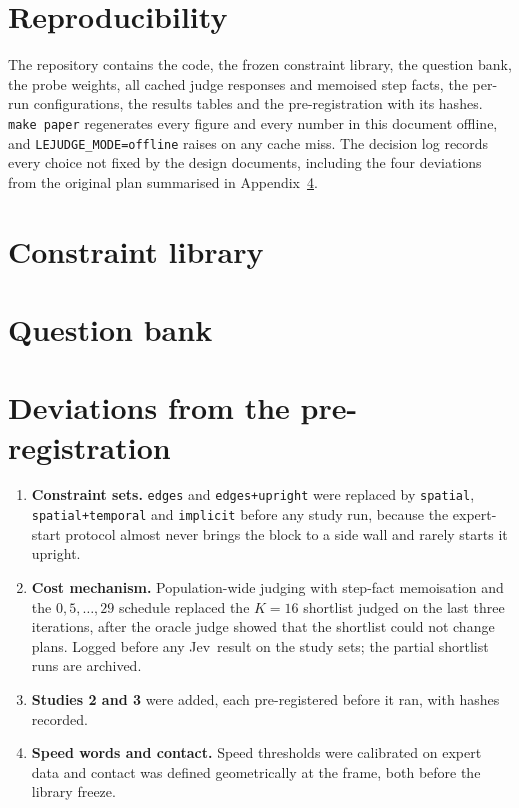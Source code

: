 \documentclass[11pt]{article}
\newcommand{\jev}{Jev}
\begin{document}
\section{Reproducibility}\label{sec:repro}
The repository contains the code, the frozen constraint library, the question bank, the probe weights, all  cached judge responses and  memoised step facts, the per-run configurations, the results tables and the pre-registration with its hashes. \texttt{make paper} regenerates every figure and every number in this document offline, and \texttt{LEJUDGE\_MODE=offline} raises on any cache miss. The decision log records every choice not fixed by the design documents, including the four deviations from the original plan summarised in Appendix~\ref{app:deviations}.




\appendix
\section{Constraint library}\label{app:library}
\footnotesize
\normalsize

\section{Question bank}\label{app:bank}

\normalsize

\section{Deviations from the pre-registration}\label{app:deviations}
\begin{enumerate}\setlength\itemsep{2pt}
\item \textbf{Constraint sets.} \texttt{edges} and \texttt{edges+upright} were replaced by \texttt{spatial}, \texttt{spatial+temporal} and \texttt{implicit} before any study run, because the expert-start protocol almost never brings the block to a side wall and rarely starts it upright.
\item \textbf{Cost mechanism.} Population-wide judging with step-fact memoisation and the $0,5,\ldots,29$ schedule replaced the $K=16$ shortlist judged on the last three iterations, after the oracle judge showed that the shortlist could not change plans. Logged before any \jev\ result on the study sets; the partial shortlist runs are archived.
\item \textbf{Studies 2 and 3} were added, each pre-registered before it ran, with hashes recorded.
\item \textbf{Speed words and contact.} Speed thresholds were calibrated on expert data and contact was defined geometrically at the frame, both before the library freeze.
\end{enumerate}
\end{document}
